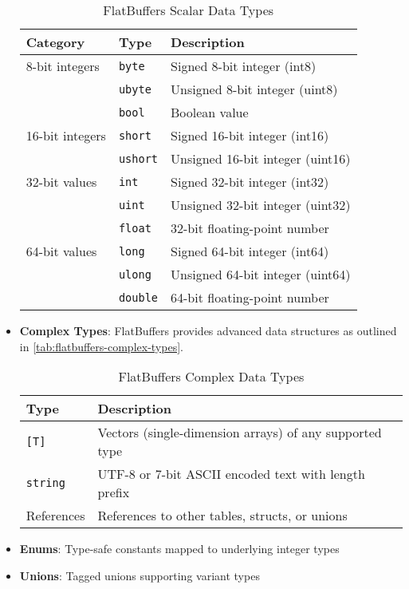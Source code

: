 \begin{itemize}
    \begin{table}[htbp]
      \centering
      \caption{FlatBuffers Scalar Data Types}
      \label{tab:flatbuffers-scalar-types}
      \begin{tabular}{|l|l|l|}
        \hline
        \textbf{Category} & \textbf{Type} & \textbf{Description} \\
        \hline
        8-bit integers & \texttt{byte} & Signed 8-bit integer (int8) \\
        & \texttt{ubyte} & Unsigned 8-bit integer (uint8) \\
        & \texttt{bool} & Boolean value \\
        \hline
        16-bit integers & \texttt{short} & Signed 16-bit integer (int16) \\
        & \texttt{ushort} & Unsigned 16-bit integer (uint16) \\
        \hline
        32-bit values & \texttt{int} & Signed 32-bit integer (int32) \\
        & \texttt{uint} & Unsigned 32-bit integer (uint32) \\
        & \texttt{float} & 32-bit floating-point number \\
        \hline
        64-bit values & \texttt{long} & Signed 64-bit integer (int64) \\
        & \texttt{ulong} & Unsigned 64-bit integer (uint64) \\
        & \texttt{double} & 64-bit floating-point number \\
        \hline
      \end{tabular}
    \end{table}

  \item \textbf{Complex Types}: FlatBuffers provides advanced data structures as outlined in \autoref{tab:flatbuffers-complex-types}.

    \begin{table}[htbp]
      \centering
      \caption{FlatBuffers Complex Data Types}
      \label{tab:flatbuffers-complex-types}
      \begin{tabular}{|l|l|}
        \hline
        \textbf{Type} & \textbf{Description} \\
        \hline
        \texttt{[T]} & Vectors (single-dimension arrays) of any supported type \\
        \hline
        \texttt{string} & UTF-8 or 7-bit ASCII encoded text with length prefix \\
        \hline
        References & References to other tables, structs, or unions \\
        \hline
      \end{tabular}
    \end{table}

  \item \textbf{Enums}: Type-safe constants mapped to underlying integer types
  \item \textbf{Unions}: Tagged unions supporting variant types
\end{itemize}

